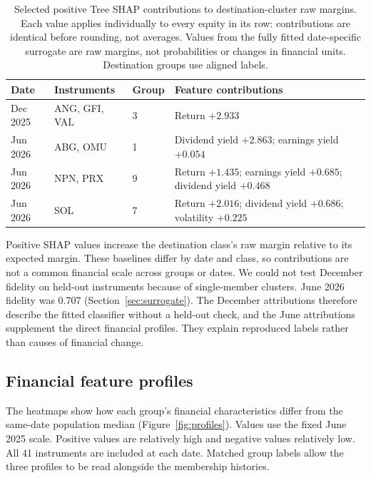 \begin{table}[htbp]
\centering
\caption{Selected positive Tree SHAP contributions to destination-cluster raw margins. Each value applies individually to every equity in its row: contributions are identical before rounding, not averages. Values from the fully fitted date-specific surrogate are raw margins, not probabilities or changes in financial units. Destination groups use aligned labels.}\label{tab:move_shap}
\footnotesize
\begin{tabularx}{\linewidth}{@{}>{\raggedright\arraybackslash}p{2.0cm}>{\raggedright\arraybackslash}p{2.0cm}p{1.1cm}X@{}}
\toprule
Date & Instruments & Group & Feature contributions \\
\midrule
Dec 2025 & ANG, GFI, VAL & 3 & Return $+2.933$ \\
Jun 2026 & ABG, OMU & 1 & Dividend yield $+2.863$; earnings yield $+0.054$ \\
Jun 2026 & NPN, PRX & 9 & Return $+1.435$; earnings yield $+0.685$; dividend yield $+0.468$ \\
Jun 2026 & SOL & 7 & Return $+2.016$; dividend yield $+0.686$; volatility $+0.225$ \\
\bottomrule
\end{tabularx}
\end{table}
\FloatBarrier

Positive SHAP values increase the destination class's raw margin relative to its expected margin. These baselines differ by date and class, so contributions are not a common financial scale across groups or dates. We could not test December fidelity on held-out instruments because of single-member clusters. June 2026 fidelity was 0.707 (Section~\ref{sec:surrogate}). The December attributions therefore describe the fitted classifier without a held-out check, and the June attributions supplement the direct financial profiles. They explain reproduced labels rather than causes of financial change.

\subsection{Financial feature profiles}

The heatmaps show how each group's financial characteristics differ from the same-date population median (Figure~\ref{fig:profiles}). Values use the fixed June 2025 scale. Positive values are relatively high and negative values relatively low. All 41 instruments are included at each date. Matched group labels allow the three profiles to be read alongside the membership histories.


